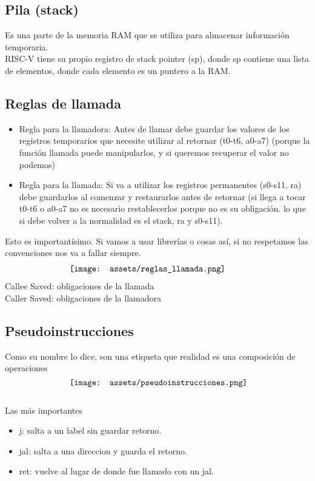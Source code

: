 \documentclass[10pt,a4paper]{article}
\begin{document}
\subsection*{Pila (stack)}
Es una parte de la memoria RAM que se utiliza para almacenar información temporaria. \\ 

RISC-V tiene su propio registro de stack pointer (sp), donde sp contiene una lista de elementos, donde cada elemento es un puntero a la RAM.  \\

\subsection*{Reglas de llamada}
\begin{itemize}
    \item Regla para la llamadora: Antes de llamar debe guardar los valores de los registros temporarios que necesite utilizar al retornar (t0-t6, a0-a7) (porque la función llamada puede manipularlos, y si queremos recuperar el valor no podemos)
    \item Regla para la llamada: Si va a utilizar los registros permanentes (s0-s11, ra) debe guardarlos al comenzar y restaurarlos antes de retornar (si llega a tocar t0-t6 o a0-a7 no es necesario restablecerlos porque no es su obligación. lo que si debe volver a la normalidad es el stack, ra y s0-s11).
\end{itemize}
Esto es importantísimo. Si vamos a usar librerías o cosas así, si no respetamos las convenciones nos va a fallar siempre. \\
\[\begin{minipage}[b]{0.6\textwidth}
    \texttt{[image: assets/reglas\_llamada.png]}
    \label{fig:reglas_llamada}
\end{minipage}\]
Callee Saved: obligaciones de la llamada \\
Caller Saved: obligaciones de la llamadora 
\subsection*{Pseudoinstrucciones}
Como su nombre lo dice, son una etiqueta que realidad es una composición de operaciones \\
\[\begin{minipage}[b]{0.6\textwidth}
    \texttt{[image: assets/pseudoinstrucciones.png]}
    \label{fig:pseudoinstrucciones}
\end{minipage}\]
Las más importantes
\begin{itemize}
    \item j: salta a un label sin guardar retorno.
    \item jal: salta a una direccion y guarda el retorno.
    \item ret: vuelve al lugar de donde fue llamado con un jal. 
\end{itemize}
\end{document}
